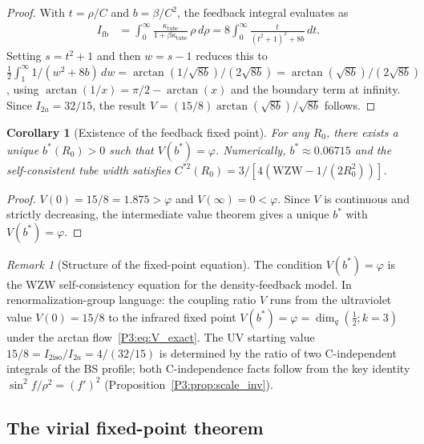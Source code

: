 \documentclass[11pt,a4paper]{article}
\newtheorem{corollary}[theorem]{Corollary}
\theoremstyle{definition}
\theoremstyle{remark}
\newtheorem{remark}[theorem]{Remark}
\newcommand{\vp}{\varphi}
\begin{document}
\begin{proof}
With $t = \rho/C$ and $b = \beta/C^2$, the feedback integral evaluates as
\begin{align*}
  I_{\mathrm{fb}}
  &= \int_0^\infty \frac{\kappa_{\mathrm{tube}}}{1+\beta\kappa_{\mathrm{tube}}}\,\rho\,d\rho
   = 8\int_0^\infty \frac{t}{(t^2+1)^2 + 8b}\,dt.
\end{align*}
Setting $s = t^2 + 1$ and then $w = s - 1$ reduces this to
$\frac{1}{2}\int_1^\infty 1/(w^2 + 8b)\,dw = \arctan(1/\sqrt{8b})/(2\sqrt{8b})
= \arctan(\sqrt{8b})/(2\sqrt{8b})$,
using $\arctan(1/x) = \pi/2 - \arctan(x)$ and the boundary term at infinity.
Since $I_{2a} = 32/15$, the result $V = (15/8)\arctan(\sqrt{8b})/\sqrt{8b}$ follows.
\end{proof}

\begin{corollary}[Existence of the feedback fixed point]
\label{P3:cor:fixedpoint_exists}
For any $R_0$, there exists a unique $b^*(R_0) > 0$ such that
$V(b^*) = \vp$.  Numerically, $b^* \approx 0.06715$ and the self-consistent
tube width satisfies $C^{*2}(R_0) = 3/[4(\mathrm{WZW} - 1/(2R_0^2))]$.
\end{corollary}

\begin{proof}
$V(0) = 15/8 = 1.875 > \vp$ and $V(\infty) = 0 < \vp$.
Since $V$ is continuous and strictly decreasing, the intermediate value
theorem gives a unique $b^*$ with $V(b^*) = \vp$.
\end{proof}

\begin{remark}[Structure of the fixed-point equation]
\label{P3:rem:fixedpoint_structure}
The condition $V(b^*) = \vp$ is the WZW self-consistency equation
for the density-feedback model.  In renormalization-group language:
the coupling ratio $V$ runs from the ultraviolet value $V(0) = 15/8$
to the infrared fixed point $V(b^*) = \vp = \dim_q(\tfrac{1}{2};k{=}3)$
under the arctan flow~\eqref{P3:eq:V_exact}.  The UV starting value
$15/8 = I_{2\mathrm{iso}}/I_{2a} = 4/(32/15)$ is determined by the ratio
of two C-independent integrals of the BS profile; both C-independence
facts follow from the key identity $\sin^2\!f/\rho^2 = (f')^2$
(Proposition~\ref{P3:prop:scale_inv}).
\end{remark}



\subsection{The virial fixed-point theorem}
\label{P3:sec:virial_fixedpt}
\end{document}
